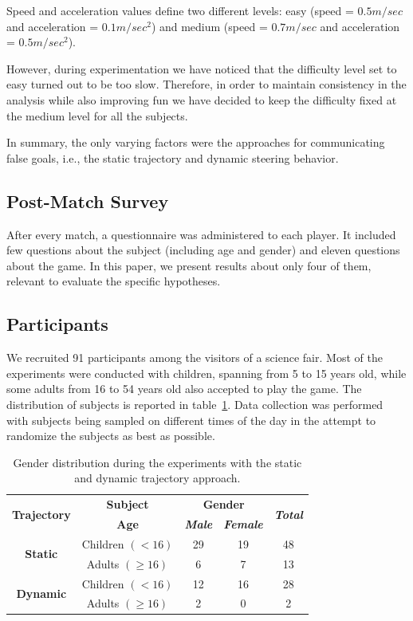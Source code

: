 Speed and acceleration values define two different levels: easy (speed = $0.5m/sec$ and acceleration = $0.1m/sec^2$) and medium (speed = $0.7m/sec$ and acceleration = $0.5m/sec^2$).

However, during experimentation we have noticed that the difficulty level set to easy turned out to be too slow. Therefore, in order to maintain consistency in the analysis while also improving fun we have decided to keep the difficulty fixed at the medium level for all the subjects.

In summary, the only varying factors were the approaches for communicating false goals, i.e., the static trajectory and dynamic steering behavior.

\subsection{Post-Match Survey}

After every match, a questionnaire was administered to each player. It included few questions about the subject (including age and gender) and eleven questions about the game. In this paper, we present results about only four of them, relevant to evaluate the specific hypotheses.

\subsection{Participants}
We recruited 91 participants among the visitors of a science fair. %
Most of the experiments were conducted with children, spanning from 5 to 15 years old, while some adults from 16 to 54 years old also accepted to play the game. The distribution of subjects is reported in table~\ref{table::subjectDistribution}. Data collection was performed with subjects being sampled on different times of the day in the attempt to randomize the subjects as best as possible. 

\begin{table}[htbp]
\caption{Gender distribution during the experiments with the static and dynamic trajectory approach.}
\begin{center}
\begin{tabular}{|c|c|c|c|c|}
\hline
\multirow{ 2}{*}{\textbf{Trajectory}} & \textbf{Subject}&\multicolumn{2}{|c|}{\textbf{Gender}} & \multirow{ 2}{*}{\textbf{\textit{Total}}} \\
\cline{3-4}
 & \textbf{Age} & \textbf{\textit{Male}}& \textbf{\textit{Female}} &  \\
\hline
\multirow{ 2}{*}{\textbf{Static}} & Children $(<16)$ & 29 & 19 & 48 \\\cline{2-5}
& Adults $(\geq 16)$ & 6 & 7 & 13 \\
\hline
\hline
\multirow{ 2}{*}{\textbf{Dynamic}} & Children $(<16)$ & 12 & 16 & 28 \\\cline{2-5}
& Adults $(\geq 16)$ & 2 & 0 & 2 \\
\hline
\end{tabular}
\label{table::subjectDistribution}
\end{center}
\end{table}

